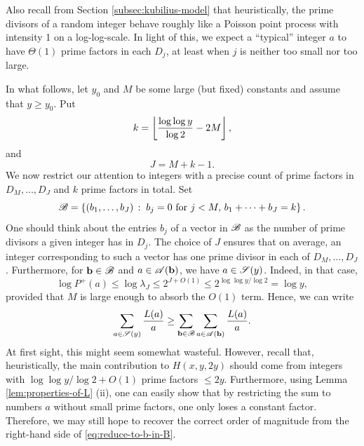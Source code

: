 Also recall from Section \ref{subsec:kubilius-model} that heuristically, the prime divisors of a random integer behave roughly like a Poisson point process with intensity 1 on a log-log-scale.
In light of this, we expect a ``typical'' integer $a$ to have $\Theta(1)$ prime factors in each $D_j$, at least when $j$ is neither too small nor too large.

In what follows, let $y_0$ and $M$ be some large (but fixed) constants and assume that $y \ge y_0$.
Put
\begin{equation*}
    k = \left\lfloor \frac{\log \log y}{\log 2} - 2M \right\rfloor,
\end{equation*}
and 
\begin{equation*}
    J = M + k - 1.
\end{equation*}
We now restrict our attention to integers with a precise count of prime factors in $D_M, \dots, D_J$ and $k$ prime factors in total.
Set
\begin{equation*}
    \mathscr{B} = \left\{(b_1, \dots, b_J)\,:\;b_j = 0 \text{ for } j < M,\, b_1 + \dots + b_J = k\right\}.
\end{equation*}
One should think about the entries $b_j$ of a vector in $\mathscr{B}$ as the number of prime divisors a given integer has in $D_j$.
The choice of $J$ ensures that on average, an integer corresponding to such a vector has one prime divisor in each of $D_M, \dots, D_J$. 
Furthermore, for $\mathbf{b} \in \mathscr{B}$ and $a \in \mathscr{A}(\mathbf{b})$, we have $a \in \mathscr{S}(y)$.
Indeed, in that case,
\begin{equation*}
    \log P^+(a) \le \log \lambda_J \le 2^{J + O(1)} \le 2^{\log \log y / \log 2} = \log y,
\end{equation*}
provided that $M$ is large enough to absorb the $O(1)$ term.
Hence, we can write
\begin{equation} \label{eq:reduce-to-b-in-B}
    \sum \limits_{a \in \mathscr{S}(y)} \frac{L(a)}{a} \ge \sum \limits_{\mathbf{b} \in \mathscr{B}} \sum \limits_{a \in \mathscr{A}(\mathbf{b})} \frac{L(a)}{a}.
\end{equation}
At first sight, this might seem somewhat wasteful. 
However, recall that, heuristically, the main contribution to $H(x, y, 2y)$ should come from integers with $\log \log y / \log 2 + O(1)$ prime factors $\le 2y$.
Furthermore, using Lemma \ref{lem:properties-of-L} (ii), one can easily show that by restricting the sum to numbers $a$ without small prime factors, one only loses a constant factor. 
Therefore, we may still hope to recover the correct order of magnitude from the right-hand side of \eqref{eq:reduce-to-b-in-B}.


